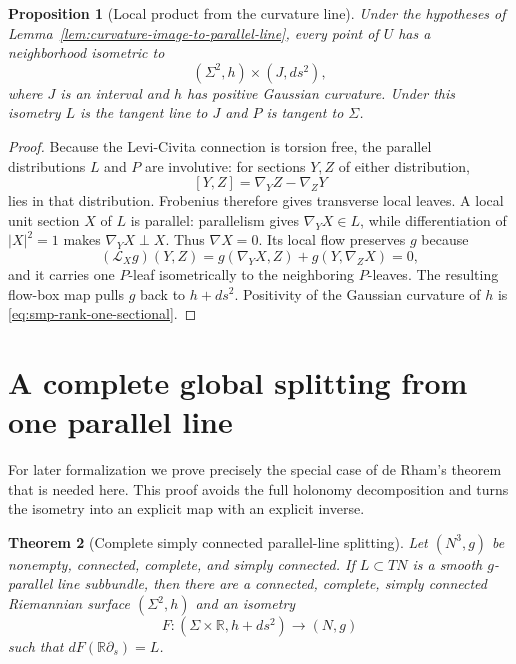\documentclass[10pt]{coll-l}
\newcommand{\R}{\mathbb{R}}
\newtheorem{theorem}{Theorem}[chapter]
\newtheorem{proposition}[theorem]{Proposition}
\theoremstyle{definition}
\theoremstyle{remark}
\numberwithin{section}{chapter}
\numberwithin{equation}{chapter}
\begin{document}
\begin{proposition}[Local product from the curvature line]
\label{prop:parallel-line-local-product}
Under the hypotheses of
Lemma~\ref{lem:curvature-image-to-parallel-line}, every point of $U$ has a
neighborhood isometric to
\[
                      (\Sigma^2,h)\times(J,ds^2),
\]
where $J$ is an interval and $h$ has positive Gaussian curvature.  Under
this isometry $L$ is the tangent line to $J$ and $P$ is tangent to
$\Sigma$.
\end{proposition}

\begin{proof}
Because the Levi-Civita connection is torsion free, the parallel
distributions $L$ and $P$ are involutive: for sections $Y,Z$ of either
distribution,
\[
                         [Y,Z]=\nabla_YZ-\nabla_ZY
\]
lies in that distribution.  Frobenius therefore gives transverse local
leaves.  A local unit section $X$ of $L$ is parallel: parallelism gives
$\nabla_YX\in L$, while differentiation of $|X|^2=1$ makes
$\nabla_YX\perp X$.  Thus $\nabla X=0$.  Its local flow preserves $g$ because
\[
       (\mathcal L_Xg)(Y,Z)
        =g(\nabla_YX,Z)+g(Y,\nabla_ZX)=0,
\]
and it carries one $P$-leaf isometrically to the neighboring $P$-leaves.
The resulting flow-box map pulls $g$ back to $h+ds^2$.  Positivity of the
Gaussian curvature of $h$ is
\eqref{eq:smp-rank-one-sectional}.
\end{proof}

\section{A complete global splitting from one parallel line}
\label{sec:parallel-line-global-splitting}

For later formalization we prove precisely the special case of de Rham's
theorem that is needed here.  This proof avoids the full holonomy
decomposition and turns the isometry into an explicit map with an explicit
inverse.

\begin{theorem}[Complete simply connected parallel-line splitting]
\label{thm:parallel-line-splitting}
Let $(N^3,g)$ be nonempty, connected, complete, and simply connected.  If
$L\subset TN$ is a smooth $g$-parallel line subbundle, then there are a
connected, complete, simply connected Riemannian surface $(\Sigma^2,h)$ and
an isometry
\begin{equation}
             F\colon(\Sigma\times\R,h+ds^2)\longrightarrow(N,g)
                                                        \label{eq:smp-global-product-isometry}
\end{equation}
such that $dF(\R\partial_s)=L$.
\end{theorem}
\end{document}
